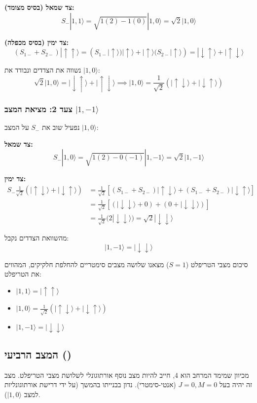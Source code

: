 \textbf{צד שמאל (בסיס מצומד):}
\[
S_- |1, 1\rangle = \sqrt{1(2) - 1(0)} |1, 0\rangle = \sqrt{2} |1, 0\rangle
\]

\textbf{צד ימין (בסיס מכפלה):}
\[
(S_{1-} + S_{2-}) |\uparrow \uparrow\rangle = (S_{1-}|\uparrow\rangle)|\uparrow\rangle + |\uparrow\rangle(S_{2-}|\uparrow\rangle) = |\downarrow \uparrow\rangle + |\uparrow \downarrow\rangle
\]

נשווה את הצדדים ונבודד את $|1, 0\rangle$:
\[
\sqrt{2} |1, 0\rangle = |\downarrow \uparrow\rangle + |\uparrow \downarrow\rangle \implies \boxed{|1, 0\rangle = \frac{1}{\sqrt{2}} \left( |\uparrow \downarrow\rangle + |\downarrow \uparrow\rangle \right)}
\]

\subsubsection*{צעד 2: מציאת המצב $|1, -1\rangle$}
נפעיל שוב את $S_-$ על המצב $|1, 0\rangle$:

\textbf{צד שמאל:}
\[
S_- |1, 0\rangle = \sqrt{1(2) - 0(-1)} |1, -1\rangle = \sqrt{2} |1, -1\rangle
\]

\textbf{צד ימין:}
\begin{align*}
S_- \frac{1}{\sqrt{2}} ( |\uparrow \downarrow\rangle + |\downarrow \uparrow\rangle ) &= \frac{1}{\sqrt{2}} \left[ (S_{1-} + S_{2-})|\uparrow \downarrow\rangle + (S_{1-} + S_{2-})|\downarrow \uparrow\rangle \right] \\
&= \frac{1}{\sqrt{2}} \left[ (|\downarrow \downarrow\rangle + 0) + (0 + |\downarrow \downarrow\rangle) \right] \\
&= \frac{1}{\sqrt{2}} (2 |\downarrow \downarrow\rangle) = \sqrt{2} |\downarrow \downarrow\rangle
\end{align*}

מהשוואת הצדדים נקבל:
\[
\boxed{|1, -1\rangle = |\downarrow \downarrow\rangle}
\]

\begin{resultbox}{סיכום מצבי הטריפלט ($S=1$)}
מצאנו שלושה מצבים סימטריים להחלפת חלקיקים, המהווים את הטריפלט:
\begin{itemize}
    \item $|1, 1\rangle = |\uparrow \uparrow\rangle$
    \item $|1, 0\rangle = \frac{1}{\sqrt{2}} (|\uparrow \downarrow\rangle + |\downarrow \uparrow\rangle)$
    \item $|1, -1\rangle = |\downarrow \downarrow\rangle$
\end{itemize}
\end{resultbox}

\subsection{המצב הרביעי ()}
מכיוון שמימד המרחב הוא 4, חייב להיות מצב נוסף אורתוגונלי לשלושת מצבי הטריפלט. מצב זה יהיה בעל $J=0, M=0$ (אנטי-סימטרי). נדון בבנייתו בהמשך (על ידי דרישת אורתוגונליות למצב $|1, 0\rangle$).

